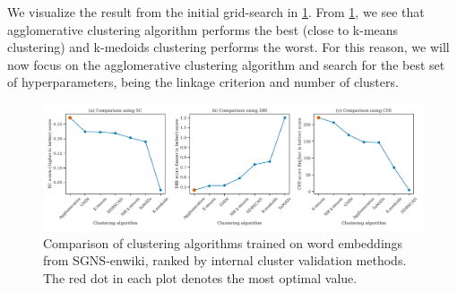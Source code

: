 We visualize the result from the initial grid-search in \cref{fig:cluster-analysis-comparison-internal-cluster-validation}. From \cref{fig:cluster-analysis-comparison-internal-cluster-validation}, we see that agglomerative clustering algorithm performs the best (close to k-means clustering) and k-medoids clustering  performs the worst. For this reason, we will now focus on the agglomerative clustering algorithm and search for the best set of hyperparameters, being the linkage criterion and number of clusters.
\begin{figure}[H]
    \centering
    \includegraphics[width=\textwidth]{thesis/figures/cluster-analysis-comparison-internal-cluster-validation.pdf}
    \caption{Comparison of clustering algorithms trained on word embeddings from SGNS-enwiki, ranked by internal cluster validation methods. The red dot in each plot denotes the most optimal value.}
    \label{fig:cluster-analysis-comparison-internal-cluster-validation}
\end{figure}

